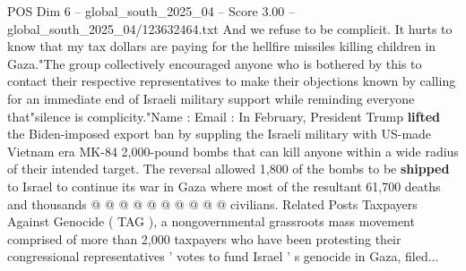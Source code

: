 \begin{textsample}{POS Dim 6 – global\_south\_2025\_04 – Score 3.00 – global\_south\_2025\_04/123632464.txt}
And we refuse to be complicit.
It hurts to know that my tax dollars are paying for the hellfire missiles killing children in Gaza."The group collectively encouraged anyone who is bothered by this to contact their respective representatives to make their objections known by calling for an immediate end of Israeli military support while reminding everyone that"silence is complicity."Name : Email : In February, President Trump \textbf{lifted} the Biden-imposed export ban by suppling the Israeli military with US-made Vietnam era MK-84 2,000-pound bombs that can kill anyone within a wide radius of their intended target.
The reversal allowed 1,800 of the bombs to be \textbf{shipped} to Israel to continue its war in Gaza where most of the resultant 61,700 deaths and thousands @ @ @ @ @ @ @ @ @ @ civilians.
Related Posts Taxpayers Against Genocide ( TAG ), a nongovernmental grassroots mass movement comprised of more than 2,000 taxpayers who have been protesting their congressional representatives ' votes to fund Israel ' s genocide in Gaza, filed...

\end{textsample}
